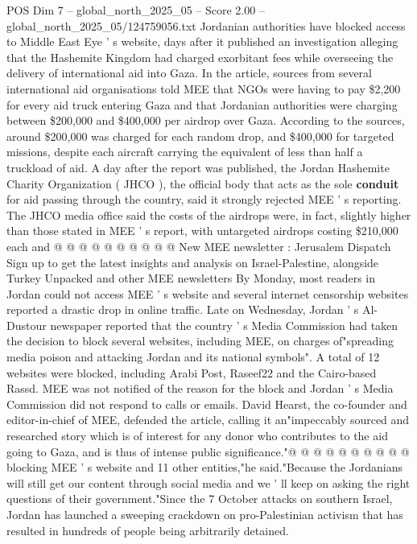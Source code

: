 \begin{textsample}{POS Dim 7 – global\_north\_2025\_05 – Score 2.00 – global\_north\_2025\_05/124759056.txt}  \label{ex:f7_pos_340}
Jordanian authorities have blocked access to Middle East Eye ' s website, days after it published an investigation alleging that the Hashemite Kingdom had charged exorbitant fees while overseeing the delivery of international aid into Gaza.
In the article, sources from several international aid organisations told MEE that NGOs were having to pay \$2,200 for every aid truck entering Gaza and that Jordanian authorities were charging between \$200,000 and \$400,000 per airdrop over Gaza.
According to the sources, around \$200,000 was charged for each random drop, and \$400,000 for targeted missions, despite each aircraft carrying the equivalent of less than half a truckload of aid.
A day after the report was published, the Jordan Hashemite Charity Organization ( JHCO ), the official body that acts as the sole \textbf{conduit} for aid passing through the country, said it strongly rejected MEE ' s reporting.
The JHCO media office said the costs of the airdrops were, in fact, slightly higher than those stated in MEE ' s report, with untargeted airdrops costing \$210,000 each and @ @ @ @ @ @ @ @ @ @ New MEE newsletter : Jerusalem Dispatch Sign up to get the latest insights and analysis on Israel-Palestine, alongside Turkey Unpacked and other MEE newsletters By Monday, most readers in Jordan could not access MEE ' s website and several internet censorship websites reported a drastic drop in online traffic.
Late on Wednesday, Jordan ' s Al-Dustour newspaper reported that the country ' s Media Commission had taken the decision to block several websites, including MEE, on charges of"spreading media poison and attacking Jordan and its national symbols".
A total of 12 websites were blocked, including Arabi Post, Raseef22 and the Cairo-based Rassd.
MEE was not notified of the reason for the block and Jordan ' s Media Commission did not respond to calls or emails.
David Hearst, the co-founder and editor-in-chief of MEE, defended the article, calling it an"impeccably sourced and researched story which is of interest for any donor who contributes to the aid going to Gaza, and is thus of intense public significance."@ @ @ @ @ @ @ @ @ @ blocking MEE ' s website and 11 other entities,"he said."Because the Jordanians will still get our content through social media and we ' ll keep on asking the right questions of their government."Since the 7 October attacks on southern Israel, Jordan has launched a sweeping crackdown on pro-Palestinian activism that has resulted in hundreds of people being arbitrarily detained.

\end{textsample}
